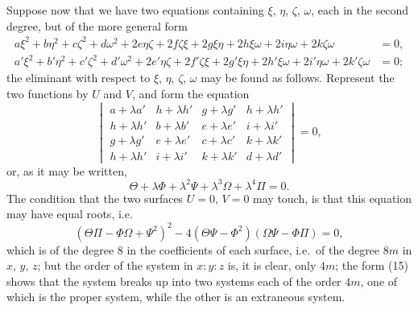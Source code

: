 \documentclass[12pt,a4paper]{article}
\begin{document}
Suppose now that we have two equations containing $\xi$, $\eta$, $\zeta$, $\omega$, each in the second degree, but of the more general form
\begin{align}
a\xi^2 + b\eta^2 + c\zeta^2 + d\omega^2 + 2e\eta\zeta + 2f\zeta\xi + 2g\xi\eta + 2h\xi\omega + 2i\eta\omega + 2k\zeta\omega &= 0, \tag{11} \\
a'\xi^2 + b'\eta^2 + c'\zeta^2 + d'\omega^2 + 2e'\eta\zeta + 2f'\zeta\xi + 2g'\xi\eta + 2h'\xi\omega + 2i'\eta\omega + 2k'\zeta\omega &= 0; \tag{12}
\end{align}
the eliminant with respect to $\xi$, $\eta$, $\zeta$, $\omega$ may be found as follows. Represent the two functions by $U$ and $V$, and form the equation
\begin{equation}
\begin{vmatrix}
a + \lambda a' & h + \lambda h' & g + \lambda g' & h + \lambda h' \\
h + \lambda h' & b + \lambda b' & e + \lambda e' & i + \lambda i' \\
g + \lambda g' & e + \lambda e' & c + \lambda c' & k + \lambda k' \\
h + \lambda h' & i + \lambda i' & k + \lambda k' & d + \lambda d'
\end{vmatrix} = 0, \tag{13}
\end{equation}
or, as it may be written,
\begin{equation}
\Theta + \lambda\Phi + \lambda^2\Psi + \lambda^3\Omega + \lambda^4\Pi = 0. \tag{14}
\end{equation}
The condition that the two surfaces $U = 0$, $V = 0$ may touch, is that this equation may have equal roots, i.e.
\begin{equation}
(\Theta\Pi - \Phi\Omega + \Psi^2)^2 - 4(\Theta\Psi - \Phi^2)(\Omega\Psi - \Phi\Pi) = 0, \tag{15}
\end{equation}
which is of the degree 8 in the coefficients of each surface, i.e.\ of the degree $8m$ in $x$, $y$, $z$; but the order of the system in $x : y : z$ is, it is clear, only $4m$; the form (15) shows that the system breaks up into two systems each of the order $4m$, one of which is the proper system, while the other is an extraneous system.
\end{document}
